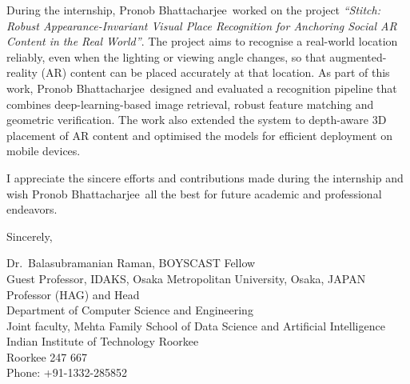 \documentclass[11pt]{article}
\makeatletter
\newcommand{\StudentName}{Pronob Bhattacharjee}
\newcommand{\ProfName}{Balasubramanian Raman}
\newcommand{\ProfDesignation}{Professor (HAG) and Head}
\newcommand{\ProfPhone}{+91-1332-285852}
\newcommand{\ProfEmail}{}   %
\makeatother
\begin{document}
During the internship, \StudentName\ worked on the project \emph{``Stitch: Robust
Appearance-Invariant Visual Place Recognition for Anchoring Social AR Content in the Real
World''}. The project aims to recognise a real-world location reliably, even when the lighting
or viewing angle changes, so that augmented-reality (AR) content can be placed accurately at
that location. As part of this work, \StudentName\ designed and evaluated a recognition
pipeline that combines deep-learning-based image retrieval, robust feature matching and
geometric verification. The work also extended the system to depth-aware 3D placement of AR
content and optimised the models for efficient deployment on mobile devices.

I appreciate the sincere efforts and contributions made during the internship and wish
\StudentName\ all the best for future academic and professional endeavors.

Sincerely,

\vspace{48pt}

Dr.\ \ProfName, BOYSCAST Fellow\\
Guest Professor, IDAKS, Osaka Metropolitan University, Osaka, JAPAN\\
\ProfDesignation\\
Department of Computer Science and Engineering\\
Joint faculty, Mehta Family School of Data Science and Artificial Intelligence\\
Indian Institute of Technology Roorkee\\
Roorkee 247 667\\
Phone: \ProfPhone%
\ifdefempty{\ProfEmail}{}{\\Email: \ProfEmail}
\end{document}
